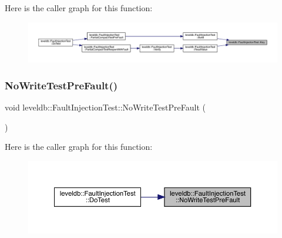 Here is the caller graph for this function\+:
\nopagebreak
\begin{figure}[H]
\begin{center}
\leavevmode
\includegraphics[width=350pt]{classleveldb_1_1_fault_injection_test_ab2599d1e090f74b7294715c8d676ff12_icgraph}
\end{center}
\end{figure}
\mbox{\label{classleveldb_1_1_fault_injection_test_a5989cfdb585f4f94364b111809161fad}} 
\subsubsection{\texorpdfstring{NoWriteTestPreFault()}{NoWriteTestPreFault()}}
{\footnotesize\ttfamily void leveldb\+::\+Fault\+Injection\+Test\+::\+No\+Write\+Test\+Pre\+Fault (\begin{DoxyParamCaption}{ }\end{DoxyParamCaption})\hspace{0.3cm}{\ttfamily [inline]}}

Here is the caller graph for this function\+:
\nopagebreak
\begin{figure}[H]
\begin{center}
\leavevmode
\includegraphics[width=350pt]{classleveldb_1_1_fault_injection_test_a5989cfdb585f4f94364b111809161fad_icgraph}
\end{center}
\end{figure}
\mbox{\label{classleveldb_1_1_fault_injection_test_a3b6eda3b745af3c89e4fe268431783ad}} 
